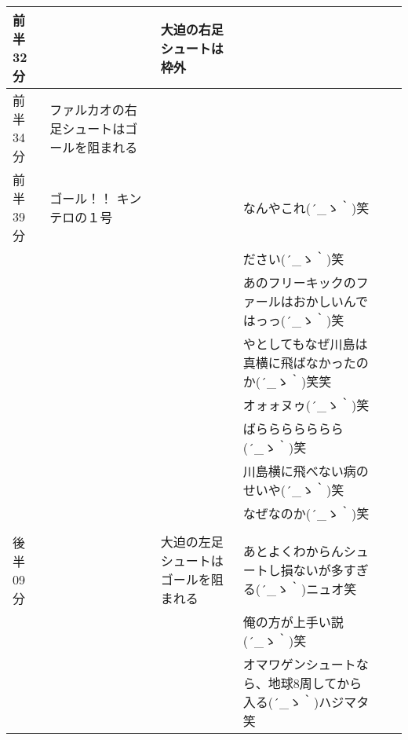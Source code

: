 \begin{table}[htb]
{\begin{tabular}{|l|l|l|l|l|l|}
      前半32分  &                                              & 大迫の右足シュートは枠外              & \\ \hline
      前半34分  & ファルカオの右足シュートはゴールを阻まれる   &                                       & \\ \hline
      前半39分  & ゴール！！ キンテロの１号                    &                                       & なんやこれ\sf (´\_ゝ｀)笑\\ \hline
                &                                              &                                       & ださい\sf (´\_ゝ｀)笑\\ \hline
                &                                              &                                       & あのフリーキックのファールはおかしいんではっっ\sf (´\_ゝ｀)笑\\ \hline
                &                                              &                                       & やとしてもなぜ川島は真横に飛ばなかったのか\sf (´\_ゝ｀)笑笑 \\ \hline
                &                                              &                                       & オォォヌゥ\sf (´\_ゝ｀)笑 \\ \hline
                &                                              &                                       & ばららららららら\sf (´\_ゝ｀)笑 \\ \hline
                &                                              &                                       & 川島横に飛べない病のせいや\sf (´\_ゝ｀)笑 \\ \hline
                &                                              &                                       & なぜなのか\sf (´\_ゝ｀)笑 \\ \hline
                &                                              &                                       &  \\ \hline
      後半09分  &                                              & 大迫の左足シュートはゴールを阻まれる  & あとよくわからんシュートし損ないが多すぎる\sf (´\_ゝ｀)ニュオ笑 \\ \hline
                &                                              &                                       & 俺の方が上手い説\sf (´\_ゝ｀)笑 \\ \hline
                &                                              &                                       & オマワゲンシュートなら、地球8周してから入る\sf (´\_ゝ｀)ハジマタ笑  \\ \hline

\end{tabular}}
\end{table}
